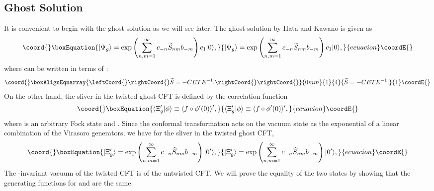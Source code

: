 \documentclass[a4paper,12pt]{article}
\begin{document}
\subsection{Ghost Solution}
It is convenient to begin with the ghost solution as we will see later.
The ghost solution by Hata and Kawano is given as \cite{Hata-Kawano}
\begin{equation}\coord{}\boxEquation{
|\Psi_g \rangle = \exp\left (\sum_{n,m=1}^{\infty}
 c_{-n} \widetilde{S}_{nm}b_{-m}\right )c_1|0\rangle,
}{
|\Psi_g \rangle = \exp\left (\sum_{n,m=1}^{\infty}
 c_{-n} \widetilde{S}_{nm}b_{-m}\right )c_1|0\rangle,
}{ecuacion}\coordE{}\end{equation}
where \coordHE{} can be written in terms of \coordHE{} \cite{Okuyama-kinetic}:
\begin{eqnarray}\coord{}\boxAlignEqnarray{\leftCoord{}\rightCoord{}\label{S-widetilde-CETE}
\widetilde{S}=-CETE^{-1}. \rightCoord{}
\rightCoord{}}{0mm}{1}{4}{\widetilde{S}=-CETE^{-1}. 
}{1}\coordE{}\end{eqnarray}
On the other hand, the sliver in the twisted ghost CFT is defined by the correlation
function \cite{GRSZstructure}
\begin{equation}\coord{}\boxEquation{
\langle \Xi'_g |\phi \rangle \equiv \langle f \circ \phi'(0)
\rangle ',
}{
\langle \Xi'_g |\phi \rangle \equiv \langle f \circ \phi'(0)
\rangle ',
}{ecuacion}\coordE{}\end{equation}
where \myHighlight{$\phi$}\coordHE{} is an arbitrary Fock state and \coordHE{}.
Since the conformal transformation \coordHE{} acts on the vacuum state
as the exponential of a linear combination of the Virasoro generators,
we have for the sliver in the twisted ghost CFT,
\begin{equation}\coord{}\boxEquation{
|\Xi'_g \rangle = \exp\left (\sum_{n,m=1}^{\infty}
 c_{-n} \widehat{S}_{nm}b_{-m}\right )|0'\rangle,
}{
|\Xi'_g \rangle = \exp\left (\sum_{n,m=1}^{\infty}
 c_{-n} \widehat{S}_{nm}b_{-m}\right )|0'\rangle,
}{ecuacion}\coordE{}\end{equation}
The \coordHE{}-invariant vacuum \coordHE{} of the twisted CFT is
\coordHE{} of the untwisted CFT.
We will prove the equality of the two states by showing that
the generating functions for \coordHE{} and \coordHE{} are
the same.
\end{document}
